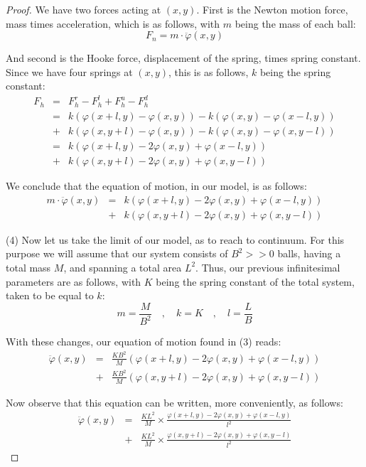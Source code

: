 \documentclass[12pt]{amsbook}
\begin{document}
\begin{proof}
We have two forces acting at $(x,y)$. First is the Newton motion force, mass times acceleration, which is as follows, with $m$ being the mass of each ball:
$$F_n=m\cdot\ddot{\varphi}(x,y)$$

And second is the Hooke force, displacement of the spring, times spring constant. Since we have four springs at $(x,y)$, this is as follows, $k$ being the spring constant:
\begin{eqnarray*}
F_h
&=&F_h^r-F_h^l+F_h^u-F_h^d\\
&=&k(\varphi(x+l,y)-\varphi(x,y))-k(\varphi(x,y)-\varphi(x-l,y))\\
&+&k(\varphi(x,y+l)-\varphi(x,y))-k(\varphi(x,y)-\varphi(x,y-l))\\
&=&k(\varphi(x+l,y)-2\varphi(x,y)+\varphi(x-l,y))\\
&+&k(\varphi(x,y+l)-2\varphi(x,y)+\varphi(x,y-l))
\end{eqnarray*}

We conclude that the equation of motion, in our model, is as follows:
\begin{eqnarray*}
m\cdot\ddot{\varphi}(x,y)
&=&k(\varphi(x+l,y)-2\varphi(x,y)+\varphi(x-l,y))\\
&+&k(\varphi(x,y+l)-2\varphi(x,y)+\varphi(x,y-l))
\end{eqnarray*}

(4) Now let us take the limit of our model, as to reach to continuum. For this purpose we will assume that our system consists of $B^2>>0$ balls, having a total mass $M$, and spanning a total area $L^2$. Thus, our previous infinitesimal parameters are as follows, with $K$ being the spring constant of the total system, taken to be equal to $k$:
$$m=\frac{M}{B^2}\quad,\quad k=K\quad,\quad l=\frac{L}{B}$$

With these changes, our equation of motion found in (3) reads:
\begin{eqnarray*}
\ddot{\varphi}(x,y)
&=&\frac{KB^2}{M}(\varphi(x+l,y)-2\varphi(x,y)+\varphi(x-l,y))\\
&+&\frac{KB^2}{M}(\varphi(x,y+l)-2\varphi(x,y)+\varphi(x,y-l))
\end{eqnarray*}

Now observe that this equation can be written, more conveniently, as follows:
\begin{eqnarray*}
\ddot{\varphi}(x,y)
&=&\frac{KL^2}{M}\times\frac{\varphi(x+l,y)-2\varphi(x,y)+\varphi(x-l,y)}{l^2}\\
&+&\frac{KL^2}{M}\times\frac{\varphi(x,y+l)-2\varphi(x,y)+\varphi(x,y-l)}{l^2}
\end{eqnarray*}


\end{proof}
\end{document}
